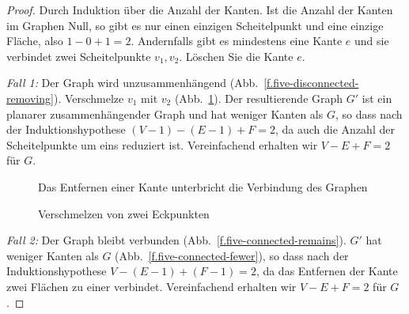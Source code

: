 \begin{proof}
Durch Induktion über die Anzahl der Kanten. Ist die Anzahl der Kanten im Graphen Null, so gibt es nur einen einzigen Scheitelpunkt und eine einzige Fläche, also $1-0+1=2$. Andernfalls gibt es mindestens eine Kante $e$ und sie verbindet zwei Scheitelpunkte $v_1,v_2$. Löschen Sie die Kante $e$.

\textit{Fall 1:}
Der Graph wird unzusammenhängend (Abb.~\ref{f.five-disconnected-removing}). Verschmelze $v_1$ mit $v_2$ (Abb.~\ref{f.five-disconnected-merge}). Der resultierende Graph $G'$ ist ein planarer zusammenhängender Graph und hat weniger Kanten als $G$, so dass nach der Induktionshypothese $(V-1)-(E-1)+F=2$, da auch die Anzahl der Scheitelpunkte um eins reduziert ist. Vereinfachend erhalten wir $V-E+F=2$ für $G$.
\begin{figure}[ht]
\begin{minipage}{.45\textwidth}
\begin{center}
\caption{Das Entfernen einer Kante unterbricht die Verbindung des Graphen}\label{f.five-disconnected-removing}
\end{center}
\end{minipage}
\hfill
\begin{minipage}{.45\textwidth}
\begin{center}
\caption{Verschmelzen von zwei Eckpunkten}\label{f.five-disconnected-merge}
\end{center}
\end{minipage}
\end{figure}

\textit{Fall 2:}
Der Graph bleibt verbunden (Abb.~\ref{f.five-connected-remains}). $G'$ hat weniger Kanten als $G$ (Abb.~\ref{f.five-connected-fewer}), so dass nach der Induktionshypothese $V-(E-1)+(F-1)=2$, da das Entfernen der Kante zwei Flächen zu einer verbindet. Vereinfachend erhalten wir $V-E+F=2$ für $G$.
\end{proof}

